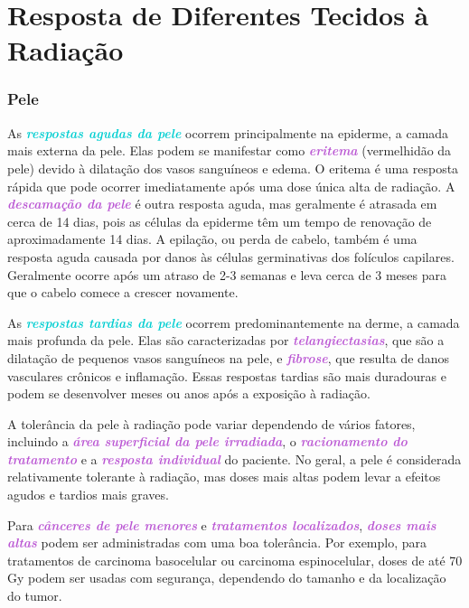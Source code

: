 \documentclass[11pt,a4paper]{article}
\newcounter{exemplo}
\begin{document}
\section{Resposta de Diferentes Tecidos à Radiação}

\subsubsection*{Pele}

	As \textcolor{DarkTurquoise}{\textbf{\textit{respostas agudas da pele}}} ocorrem principalmente na epiderme, a camada mais externa da pele. Elas podem se manifestar como \textcolor{MediumOrchid}{\textbf{\textit{eritema}}} (vermelhidão da pele) devido à dilatação dos vasos sanguíneos e edema. O eritema é uma resposta rápida que pode ocorrer imediatamente após uma dose única alta de radiação. A \textcolor{MediumOrchid}{\textbf{\textit{descamação da pele}}} é outra resposta aguda, mas geralmente é atrasada em cerca de 14 dias, pois as células da epiderme têm um tempo de renovação de aproximadamente 14 dias. A epilação, ou perda de cabelo, também é uma resposta aguda causada por danos às células germinativas dos folículos capilares. Geralmente ocorre após um atraso de 2-3 semanas e leva cerca de 3 meses para que o cabelo comece a crescer novamente.

	As \textcolor{DarkTurquoise}{\textbf{\textit{respostas tardias da pele}}} ocorrem predominantemente na derme, a camada mais profunda da pele. Elas são caracterizadas por \textcolor{MediumOrchid}{\textbf{\textit{telangiectasias}}}, que são a dilatação de pequenos vasos sanguíneos na pele, e \textcolor{MediumOrchid}{\textbf{\textit{fibrose}}}, que resulta de danos vasculares crônicos e inflamação. Essas respostas tardias são mais duradouras e podem se desenvolver meses ou anos após a exposição à radiação.

	A tolerância da pele à radiação pode variar dependendo de vários fatores, incluindo a \textcolor{MediumOrchid}{\textbf{\textit{área superficial da pele irradiada}}}, o \textcolor{MediumOrchid}{\textbf{\textit{racionamento do tratamento}}} e a \textcolor{MediumOrchid}{\textbf{\textit{resposta individual}}} do paciente. No geral, a pele é considerada relativamente tolerante à radiação, mas doses mais altas podem levar a efeitos agudos e tardios mais graves.

	Para \textcolor{MediumOrchid}{\textbf{\textit{cânceres de pele menores}}} e \textcolor{MediumOrchid}{\textbf{\textit{tratamentos localizados}}}, \textcolor{MediumOrchid}{\textbf{\textit{doses mais altas}}} podem ser administradas com uma boa tolerância. Por exemplo, para tratamentos de carcinoma basocelular ou carcinoma espinocelular, doses de até 70 Gy podem ser usadas com segurança, dependendo do tamanho e da localização do tumor.
\end{document}
